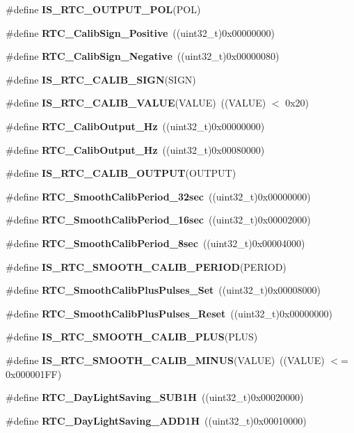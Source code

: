 \begin{DoxyCompactItemize}
\item 
\#define \textbf{ I\+S\+\_\+\+R\+T\+C\+\_\+\+O\+U\+T\+P\+U\+T\+\_\+\+P\+OL}(P\+OL)
\item 
\#define \textbf{ R\+T\+C\+\_\+\+Calib\+Sign\+\_\+\+Positive}~((uint32\+\_\+t)0x00000000)
\item 
\#define \textbf{ R\+T\+C\+\_\+\+Calib\+Sign\+\_\+\+Negative}~((uint32\+\_\+t)0x00000080)
\item 
\#define \textbf{ I\+S\+\_\+\+R\+T\+C\+\_\+\+C\+A\+L\+I\+B\+\_\+\+S\+I\+GN}(S\+I\+GN)
\item 
\#define \textbf{ I\+S\+\_\+\+R\+T\+C\+\_\+\+C\+A\+L\+I\+B\+\_\+\+V\+A\+L\+UE}(V\+A\+L\+UE)~((V\+A\+L\+UE) $<$ 0x20)
\item 
\#define \textbf{ R\+T\+C\+\_\+\+Calib\+Output\+\_\+Hz}~((uint32\+\_\+t)0x00000000)
\item 
\#define \textbf{ R\+T\+C\+\_\+\+Calib\+Output\+\_\+Hz}~((uint32\+\_\+t)0x00080000)
\item 
\#define \textbf{ I\+S\+\_\+\+R\+T\+C\+\_\+\+C\+A\+L\+I\+B\+\_\+\+O\+U\+T\+P\+UT}(O\+U\+T\+P\+UT)
\item 
\#define \textbf{ R\+T\+C\+\_\+\+Smooth\+Calib\+Period\+\_\+32sec}~((uint32\+\_\+t)0x00000000)
\item 
\#define \textbf{ R\+T\+C\+\_\+\+Smooth\+Calib\+Period\+\_\+16sec}~((uint32\+\_\+t)0x00002000)
\item 
\#define \textbf{ R\+T\+C\+\_\+\+Smooth\+Calib\+Period\+\_\+8sec}~((uint32\+\_\+t)0x00004000)
\item 
\#define \textbf{ I\+S\+\_\+\+R\+T\+C\+\_\+\+S\+M\+O\+O\+T\+H\+\_\+\+C\+A\+L\+I\+B\+\_\+\+P\+E\+R\+I\+OD}(P\+E\+R\+I\+OD)
\item 
\#define \textbf{ R\+T\+C\+\_\+\+Smooth\+Calib\+Plus\+Pulses\+\_\+\+Set}~((uint32\+\_\+t)0x00008000)
\item 
\#define \textbf{ R\+T\+C\+\_\+\+Smooth\+Calib\+Plus\+Pulses\+\_\+\+Reset}~((uint32\+\_\+t)0x00000000)
\item 
\#define \textbf{ I\+S\+\_\+\+R\+T\+C\+\_\+\+S\+M\+O\+O\+T\+H\+\_\+\+C\+A\+L\+I\+B\+\_\+\+P\+L\+US}(P\+L\+US)
\item 
\#define \textbf{ I\+S\+\_\+\+R\+T\+C\+\_\+\+S\+M\+O\+O\+T\+H\+\_\+\+C\+A\+L\+I\+B\+\_\+\+M\+I\+N\+US}(V\+A\+L\+UE)~((V\+A\+L\+UE) $<$= 0x000001\+F\+F)
\item 
\#define \textbf{ R\+T\+C\+\_\+\+Day\+Light\+Saving\+\_\+\+S\+U\+B1H}~((uint32\+\_\+t)0x00020000)
\item 
\#define \textbf{ R\+T\+C\+\_\+\+Day\+Light\+Saving\+\_\+\+A\+D\+D1H}~((uint32\+\_\+t)0x00010000)

\end{DoxyCompactItemize}
